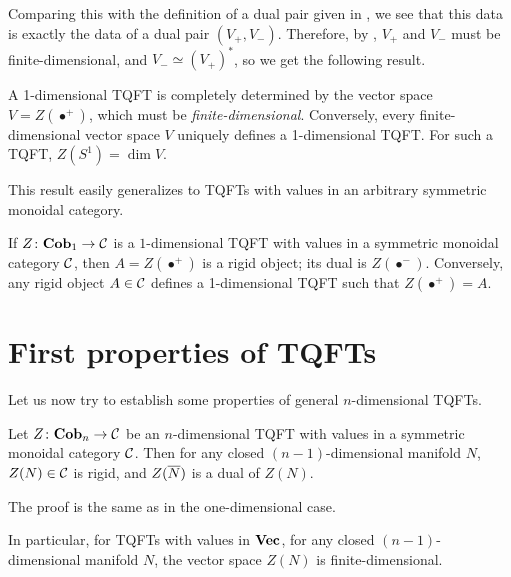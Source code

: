 Comparing this with the definition of a dual pair given in , we
see that this data is exactly the data of a dual pair $(V_+, V_-)$. Therefore,
by , $V_+$ and $V_-$ must be finite-dimensional, and
$V_-\simeq (V_+)^*$, so we get the following result.

\begin{theorem}\label{t:1d-tqft2}
  A 1-dimensional TQFT is completely determined by the vector space
  $V=Z(\bullet^+)$, which must be \emph{finite-dimensional}. Conversely, every
  finite-dimensional vector space $V$ uniquely defines a 1-dimensional TQFT. For
  such a TQFT, $Z(S^1)=\dim V$.
\end{theorem}

This result easily generalizes to TQFTs with values in an arbitrary
symmetric monoidal category.
\begin{theorem}\label{t:1d-tqft}
  If $Z\colon \mathbf{Cob}_1\to \mathcal{C}$ is a $1$-dimensional TQFT with values in a
  symmetric monoidal category $\mathcal{C}$, then $A=Z(\bullet^+)$ is a rigid object;
  its dual is $Z(\bullet^-)$. Conversely, any rigid object $A\in \mathcal{C}$ defines
  a 1-dimensional TQFT such that $Z(\bullet^+)=A$.
\end{theorem}



\section{First properties of TQFTs}\label{s:first-properties}



Let us now try to establish some properties of general $n$-dimensional TQFTs.

\begin{theorem}\label{t:tqft-rigidity}
  Let $Z\colon \mathbf{Cob}_n\to \mathcal{C}$ be an $n$-dimensional TQFT with values in a
  symmetric monoidal category $\mathcal{C}$. Then for any closed $(n-1)$-dimensional
  manifold $N$, $Z(N)\in \mathcal{C}$ is rigid, and $Z(\overline{N})$ is a dual of $Z(N)$.
\end{theorem}
The proof is the same as in the one-dimensional case.

In particular, for TQFTs with values in $\mathbf{Vec}$, for any closed
$(n-1)$-dimensional manifold $N$, the vector space $Z(N)$ is finite-dimensional.

